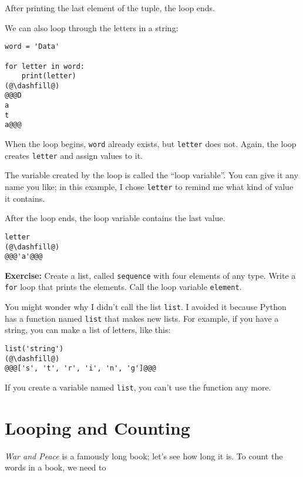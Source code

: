 After printing the last element of the tuple, the loop ends.

We can also loop through the letters in a string:

\begin{lstlisting}[]
word = 'Data'

for letter in word:
    print(letter)
(@\dashfill@)
@@@D
a
t
a@@@
\end{lstlisting}

When the loop begins, \passthrough{\lstinline!word!} already exists, but
\passthrough{\lstinline!letter!} does not. Again, the loop creates
\passthrough{\lstinline!letter!} and assign values to it.

The variable created by the loop is called the ``loop variable''. You
can give it any name you like; in this example, I chose
\passthrough{\lstinline!letter!} to remind me what kind of value it
contains.

After the loop ends, the loop variable contains the last value.

\begin{lstlisting}[]
letter
(@\dashfill@)
@@@'a'@@@
\end{lstlisting}

\textbf{Exercise:} Create a list, called
\passthrough{\lstinline!sequence!} with four elements of any type. Write
a \passthrough{\lstinline!for!} loop that prints the elements. Call the
loop variable \passthrough{\lstinline!element!}.

You might wonder why I didn't call the list
\passthrough{\lstinline!list!}. I avoided it because Python has a
function named \passthrough{\lstinline!list!} that makes new lists. For
example, if you have a string, you can make a list of letters, like
this:

\begin{lstlisting}[]
list('string')
(@\dashfill@)
@@@['s', 't', 'r', 'i', 'n', 'g']@@@
\end{lstlisting}

If you create a variable named \passthrough{\lstinline!list!}, you can't
use the function any more.

\hypertarget{looping-and-counting}{%
\section{Looping and Counting}\label{looping-and-counting}}

\emph{War and Peace} is a famously long book; let's see how long it is.
To count the words in a book, we need to

